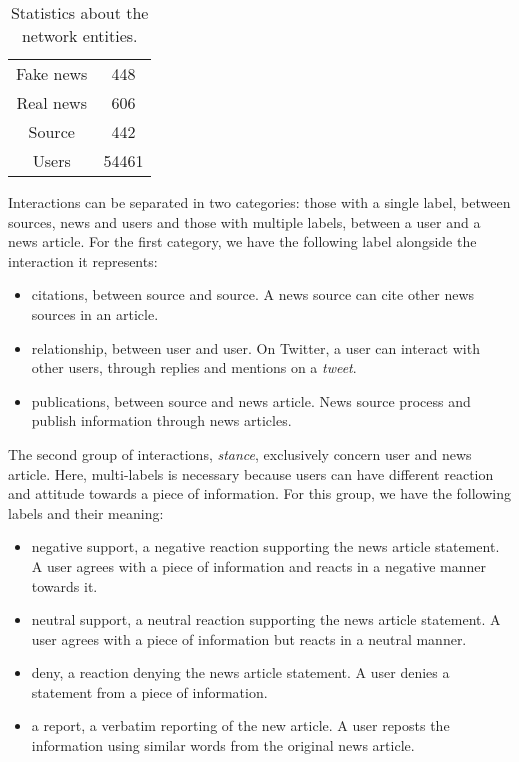 \begin{table}[h]
    \centering
    \caption{Statistics about the network entities.}
    \label{tab:dataset:entities}
    \begin{tabular}{cc}
        \toprule
        Fake news & 448\\
        Real news & 606\\
        Source & 442\\
        Users & 54461\\
        \bottomrule
    \end{tabular}
\end{table}

Interactions can be separated in two categories: those with a single label, between sources, news and users and those with multiple labels, between a user and a news article.
For the first category, we have the following label alongside the interaction it represents:
\begin{itemize}
    \item citations, between source and source.
        A news source can cite other news sources in an article.
    \item relationship, between user and user.
        On Twitter, a user can interact with other users, through replies and mentions on a \textit{tweet}.
    \item publications, between source and news article. News source process and publish information through news articles.
\end{itemize}

The second group of interactions, \textit{stance}, exclusively concern user and news article.
Here, multi-labels is necessary because users can have different reaction and attitude towards a piece of information.
For this group, we have the following labels and their meaning:
\begin{itemize}
    \item negative support, a negative reaction supporting the news article statement.
        A user agrees with a piece of information and reacts in a negative manner towards it. 
    \item neutral support, a neutral reaction supporting the news article statement.
        A user agrees with a piece of information but reacts in a neutral manner.
    \item deny, a reaction denying the news article statement.
        A user denies a statement from a piece of information.
    \item a report, a verbatim reporting of the new article.
        A user reposts the information using similar words from the original news article.
\end{itemize}

